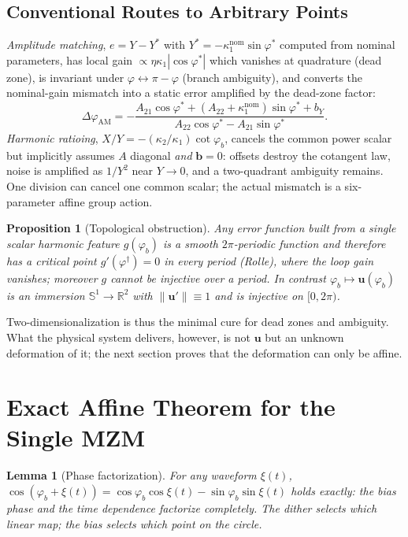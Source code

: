 \documentclass[journal]{IEEEtran}
\newtheorem{lemma}{Lemma}
\newtheorem{proposition}{Proposition}
\newcommand{\uv}{\mathbf{u}}
\newcommand{\bv}{\mathbf{b}}
\begin{document}
\subsection{Conventional Routes to Arbitrary Points}
\emph{Amplitude matching}, $e=Y-Y^\ast$ with
$Y^\ast=-\kappa_1^{\mathrm{nom}}\sin\varphi^\ast$ computed from nominal
parameters, has local gain
$\propto\eta\kappa_1|\cos\varphi^\ast|$ which vanishes at quadrature
(dead zone), is invariant under
$\varphi\leftrightarrow\pi-\varphi$ (branch ambiguity), and converts the
nominal-gain mismatch into a static error amplified by the dead-zone
factor:
\begin{equation}
\Delta\varphi_{\mathrm{AM}}
=-\frac{A_{21}\cos\varphi^\ast+(A_{22}{+}\kappa_1^{\mathrm{nom}})
\sin\varphi^\ast+b_Y}{A_{22}\cos\varphi^\ast-A_{21}\sin\varphi^\ast}.
\label{eq:staticAM}
\end{equation}
\emph{Harmonic ratioing}, $X/Y=-(\kappa_2/\kappa_1)\cot\varphi_b$,
cancels the common power scalar but implicitly assumes $A$ diagonal
\emph{and} $\bv=0$: offsets destroy the cotangent law, noise is
amplified as $1/Y^2$ near $Y\!\to\!0$, and a two-quadrant ambiguity
remains. One division can cancel one common scalar; the actual mismatch
is a six-parameter affine group action.

\begin{proposition}[Topological obstruction]
\label{prop:rolle}
Any error function built from a single scalar harmonic feature
$g(\varphi_b)$ is a smooth $2\pi$-periodic function and therefore has a
critical point $g'(\varphi^\dagger)=0$ in every period (Rolle), where
the loop gain vanishes; moreover $g$ cannot be injective over a period.
In contrast $\varphi_b\mapsto\uv(\varphi_b)$ is an immersion
$\mathbb{S}^1\!\to\!\mathbb{R}^2$ with
$\|\uv'\|\equiv 1$ and is injective on $[0,2\pi)$.
\end{proposition}

Two-dimensionalization is thus the minimal cure for dead zones and
ambiguity. What the physical system delivers, however, is not $\uv$ but
an unknown deformation of it; the next section proves that the
deformation can only be affine.

\section{Exact Affine Theorem for the Single MZM}
\label{sec:affine}

\begin{lemma}[Phase factorization]
\label{lem:fact}
For any waveform $\xi(t)$,
$\cos(\varphi_b+\xi(t))=\cos\varphi_b\cos\xi(t)-\sin\varphi_b\sin\xi(t)$
holds exactly: the bias phase and the time dependence factorize
completely. The dither selects \emph{which} linear map; the bias selects
\emph{which point on the circle}.
\end{lemma}
\end{document}

